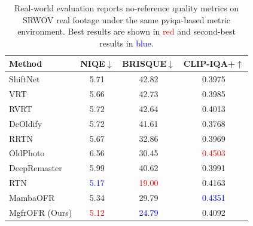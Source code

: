 \documentclass[symmetry,article,submit,pdftex,moreauthors]{Definitions/mdpi}
\DeclareRobustCommand{\bestres}[1]{\textcolor{red}{#1}} %
\DeclareRobustCommand{\secondres}[1]{\textcolor{blue}{#1}} %
\providecommand{\DIFaddbegin}{} %
\providecommand{\DIFaddend}{} %
\providecommand{\DIFdelend}{} %
\begin{document}
\DIFdelend \DIFaddbegin \begin{table}[htbp]
\caption{Real-world evaluation reports no-reference quality metrics on SRWOV real footage under the same pyiqa-based metric environment. Best results are shown in \bestres{red} and second-best results in \secondres{blue}.\label{tab:realworld}}
\begin{tabularx}{\textwidth}{lCCC}
\toprule
\textbf{Method} & \textbf{NIQE$\downarrow$} & \textbf{BRISQUE$\downarrow$} & \textbf{CLIP-IQA+$\uparrow$} \\
\midrule
ShiftNet~\cite{li2023shiftnet}             & 5.71  & 42.82 & 0.3975 \\
VRT~\cite{liang2024vrt}                    & 5.66  & 42.73 & 0.3985 \\
RVRT~\cite{liang2022rvrt}                 & 5.72  & 42.64 & 0.4013 \\
DeOldify~\cite{jantic2019deoldify}         & 5.72  & 41.61 & 0.3768 \\
RRTN~\cite{lin2024rrtn}                   & 5.67  & 32.86 & 0.3969 \\
OldPhoto~\cite{wan2023oldphotopami}        & 6.56  & 30.45 & \bestres{0.4503} \\
DeepRemaster~\cite{iizuka2019deepremaster} & 5.99  & 40.62 & 0.3991 \\
RTN~\cite{wan2022rtn}                      & \secondres{5.17}  & \bestres{19.00} & 0.4163 \\
MambaOFR~\cite{mao2025mambaofr}           & 5.34  & 29.79 & \secondres{0.4351} \\
\midrule
MgfrOFR (Ours)                             & \bestres{5.12}  & \secondres{24.79} & 0.4092 \\
\bottomrule
\end{tabularx}
\end{table}
\DIFaddend 
\end{document}
